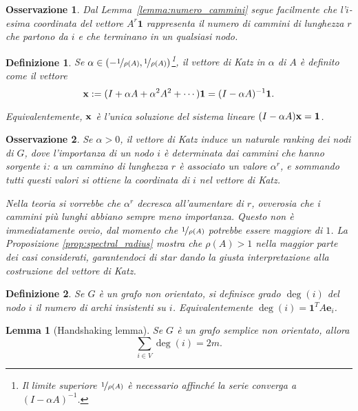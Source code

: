 \documentclass[a4paper]{article}
\newcommand{\xvec}{{\bf x}}
\newcommand{\bone}{\mathbf{1}}
\newcommand{\inv}{^{-1}}
\newtheorem{lemma}{Lemma}
\newtheorem{definition}{Definizione}
\newtheorem{remark}{Osservazione}
\begin{document}
\begin{remark}
    \label{remark:molt_per_1}
    Dal Lemma~\ref{lemma:numero_cammini} segue facilmente che l'$i$-esima
    coordinata del vettore $A^r \bone$ rappresenta il numero di cammini
    di lunghezza $r$ che partono da $i$ e che terminano in un qualsiasi nodo.
\end{remark}

\begin{definition} Se $\alpha \in (-\nicefrac{1}{\rho(A)}, \nicefrac{1}{\rho(A)})$\footnote{Il limite superiore $\nicefrac{1}{\rho(A)}$ è necessario affinché la serie converga a $(I-\alpha A)\inv$.}, {\rm il vettore di Katz in $\alpha$ di $A$} è definito come il vettore
\[
    \xvec := (I + \alpha A + \alpha^2A^2+\cdots) \bone = (I-\alpha A)\inv \bone.
\]

Equivalentemente, $\xvec$ è l'unica soluzione del sistema lineare $(I-\alpha A)\xvec = \bone$.
\end{definition}

\begin{remark}
    Se $\alpha > 0$, il vettore di Katz induce un naturale ranking dei nodi di $G$, dove l'importanza
    di un nodo $i$ è determinata dai cammini che hanno sorgente $i$: a
    un cammino di lunghezza $r$ è associato un valore $\alpha^r$,
    e sommando tutti questi valori si ottiene la coordinata di $i$
    nel vettore di Katz.

    Nella teoria si vorrebbe che $\alpha^r$ decresca all'aumentare di $r$,
    ovverosia che i cammini più lunghi abbiano sempre meno importanza.
    Questo non è immediatamente ovvio, dal momento che $\nicefrac{1}{\rho(A)}$ potrebbe essere maggiore di $1$. La {\rm Proposizione
    \ref{prop:spectral_radius}} mostra che $\rho(A) > 1$ nella maggior
    parte dei casi considerati, garantendoci di star dando la giusta
    interpretazione alla costruzione del vettore di Katz.
\end{remark}

\begin{definition}
    Se $G$ è un grafo non orientato, si definisce {\rm grado} $\deg(i)$
    del nodo $i$ il numero di archi insistenti su $i$. Equivalentemente
    $\deg(i) = \bone^T A \mathbf{e}_i$.
\end{definition}

\begin{lemma}[Handshaking lemma]
    \label{lemma:handshake}
    Se $G$ è un grafo semplice non orientato, allora
    \[ \sum_{i \in V} \deg(i) = 2m. \]
\end{lemma}
\end{document}
